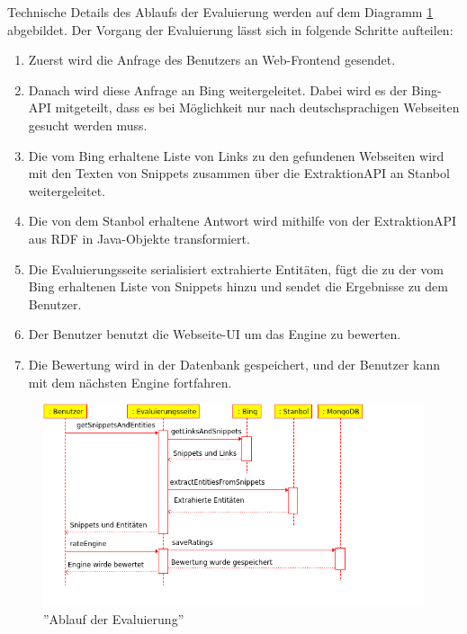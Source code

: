 Technische Details des Ablaufs der Evaluierung werden auf dem Diagramm \ref{fig:eval-ablauf} abgebildet. Der Vorgang der Evaluierung lässt sich in folgende Schritte aufteilen:
\begin{enumerate}
\item Zuerst wird die Anfrage des Benutzers an Web-Frontend gesendet.
\item Danach wird diese Anfrage an Bing weitergeleitet. Dabei wird es der Bing-API mitgeteilt, dass es bei Möglichkeit nur nach deutschsprachigen Webseiten gesucht werden muss.
\item Die vom Bing erhaltene Liste von Links zu den gefundenen Webseiten wird mit den Texten von Snippets zusammen über die ExtraktionAPI an Stanbol weitergeleitet.
\item Die von dem Stanbol erhaltene Antwort wird mithilfe von der ExtraktionAPI aus RDF in Java-Objekte transformiert.
\item Die Evaluierungsseite serialisiert extrahierte Entitäten, fügt die zu der vom Bing erhaltenen Liste von Snippets hinzu und sendet die Ergebnisse zu dem Benutzer.
\item Der Benutzer benutzt die Webseite-UI um das Engine zu bewerten.
\item Die Bewertung wird in der Datenbank gespeichert, und der Benutzer kann mit dem nächsten Engine fortfahren.
\end{enumerate}

\begin{figure}
\centering
\includegraphics[width=1\textwidth]{Bilder/eval_sequence.png}
\caption{''Ablauf der Evaluierung''}
\label{fig:eval-ablauf}
\end{figure}

